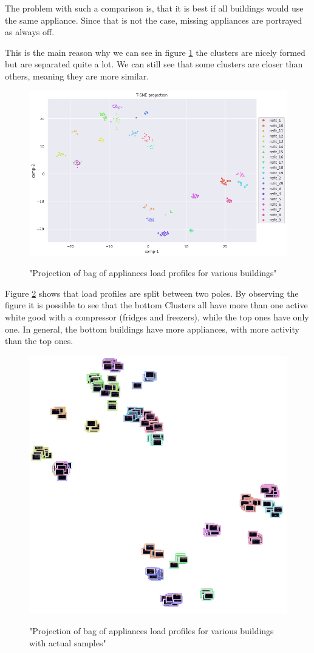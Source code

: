 The problem with such a comparison is, that it is best 
if all buildings would use the same appliance.
Since that is not the case, missing appliances are portrayed as always off. 

This is the main reason why we can see in figure \ref{fig:tsne_boa_scatter_refit8} the clusters are nicely formed
but are separated quite a lot. We can still see that some clusters are closer than others,
meaning they are more similar.

\begin{figure}[H]
	\centering
	\caption{"Projection of bag of appliances load profiles for various buildings"}
	\includegraphics[width=.8\textwidth]{Figures/TSNE/TSNE_BOA/refit/scatter_refit_all.png}
	\label{fig:tsne_boa_scatter_refit8}
\end{figure}

Figure \ref{fig:tsne_boa_img_scatter_refit8} shows that load profiles are split 
between two poles. By observing the figure it is possible to see that the bottom Clusters
all have more than one active white good with a compressor (fridges and freezers), while
the top ones have only one. In general, the bottom buildings have more appliances,
with more activity than the top ones. 

\begin{figure}[H]
	\centering
	\caption{"Projection of bag of appliances load profiles for various buildings with actual samples"}
	\includegraphics[width=.9\textwidth]{Figures/TSNE/TSNE_BOA/refit/img_scatter_refitall.png}
	\label{fig:tsne_boa_img_scatter_refit8}
\end{figure}